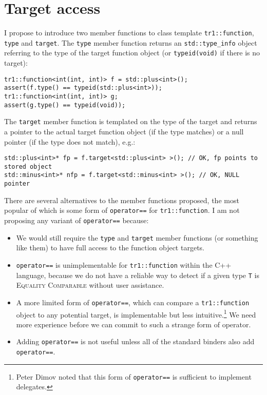 \documentclass{article}
\begin{document}
\section{Target access}
I propose to introduce two member functions to class template
\texttt{tr1::function}, \texttt{type} and \texttt{target}. The
\texttt{type} member function returns an \texttt{std::type\_info}
object referring to the type of the target function object (or
\texttt{typeid(void)} if there is no target):

\begin{verbatim}
tr1::function<int(int, int)> f = std::plus<int>();
assert(f.type() == typeid(std::plus<int>));
tr1::function<int(int, int)> g;
assert(g.type() == typeid(void));
\end{verbatim}

The \texttt{target} member function is templated on the type of the
target and returns a pointer to the actual target function object (if
the type matches) or a null pointer (if the type does not match),
e.g.:

\begin{verbatim}
std::plus<int>* fp = f.target<std::plus<int> >(); // OK, fp points to stored object
std::minus<int>* nfp = f.target<std::minus<int> >(); // OK, NULL pointer
\end{verbatim}

There are several alternatives to the member functions proposed, the
most popular of which is some form of \texttt{operator==} for
\texttt{tr1::function}. I am not proposing any variant of
\texttt{operator==} because:
\begin{itemize}

\item We would still require the \texttt{type} and \texttt{target}
member functions (or something like them) to have full access to the
function object targets.

\item \texttt{operator==} is unimplementable for
\texttt{tr1::function} within the C++ language, because we do not have
a reliable way to detect if a given type \texttt{T} is
\textsc{Equality Comparable} without user assistance.

\item A more limited form of \texttt{operator==}, which can compare a
\texttt{tr1::function} object to any potential target, is
implementable but less intuitive.\footnote{Peter Dimov noted that
this form of \texttt{operator==} is sufficient to implement
delegates.} We need more experience before we can commit to such a
strange form of operator.

\item Adding \texttt{operator==} is not useful unless all of the
standard binders also add \texttt{operator==}. 
\end{itemize}
\end{document}
